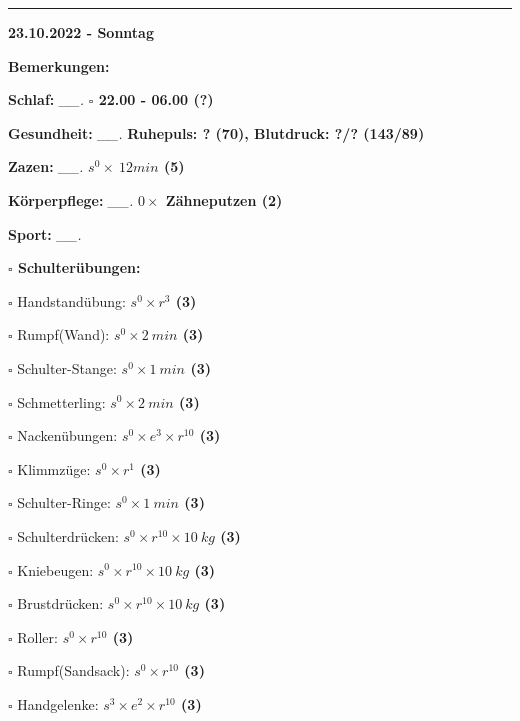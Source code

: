 \documentclass[10pt,a4paper]{article}
\newcommand\prop[1] {{\color {alizarin} {\bf #1}}}        %
\newcommand\mand[1] {{\color {burntorange} {\bf #1}}}     %
\newcommand\ddivide {\vskip -9pt \hrule \vskip 6pt}
\newcommand\topspace{\vskip -15pt \hskip 20pt}
\newcommand\n[1] { {\sl #1.} \hskip 5pt }
\begin{document}
\ddivide
{\prop {23.10.2022 - Sonntag}}

\begin{mdframed}[style=daystyle]
  \begin{labeling}{{\mand {Bemerkungen:}}}
    \setlength\itemsep{-3pt}
  \item[{\mand {Schlaf:}}]       \n{\_\_} {\prop {$\square$ 22.00 - 06.00 (?)}}
  \item[{\mand {Gesundheit:}}]   \n{\_\_} {\prop {Ruhepuls: ? (70), Blutdruck: ?/? (143/89)}}
  \item[{\mand {Zazen:}}]        \n{\_\_} {\prop {$s^0 \times\ 12 min$ (5)}}
  \item[{\mand {Körperpflege:}}] \n{\_\_} {\prop {$0 \times$ Zähneputzen (2)}}
  \item[{\mand {Sport:}}]        \n{\_\_}
    \topspace
    \begin{minipage}{0.75\textwidth}  
      \begin{labeling}{\prop {$\square$ {Schulterübungen:}}} 
        \setlength\itemsep{-3pt}
      \item[$\square$ Handstandübung:]  {\prop {$s^0 \times r^{3}$ (3)}}
      \item[$\square$ Rumpf(Wand):]     {\prop {$s^0 \times 2\ min$ (3)}}
      \item[$\square$ Schulter-Stange:] {\prop {$s^0 \times 1\ min$ (3)}}
      \item[$\square$ Schmetterling:]   {\prop {$s^0 \times 2\ min$ (3)}}
      \item[$\square$ Nackenübungen:]   {\prop {$s^0 \times e^3 \times r^{10}$ (3)}}
      \item[$\square$ Klimmzüge:]       {\prop {$s^0 \times r^1$ (3)}}
      \item[$\square$ Schulter-Ringe:]  {\prop {$s^0 \times 1\ min$ (3)}}
      \item[$\square$ Schulterdrücken:] {\prop {$s^0 \times r^{10} \times 10\ kg$ (3)}}
      \item[$\square$ Kniebeugen:]      {\prop {$s^0 \times r^{10} \times 10\ kg$ (3)}}
      \item[$\square$ Brustdrücken:]    {\prop {$s^0 \times r^{10} \times 10\ kg$ (3)}}
      \item[$\square$ Roller:]          {\prop {$s^0 \times r^{10}$ (3)}}
      \item[$\square$ Rumpf(Sandsack):] {\prop {$s^0 \times r^{10}$ (3)}}
      \item[$\square$ Handgelenke:]     {\prop {$s^3 \times e^2 \times r^{10}$ (3)}}

\end{labeling}
\end{minipage}
\end{labeling}
\end{mdframed}
\end{document}
